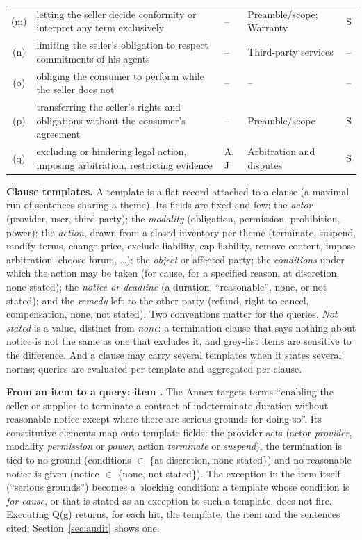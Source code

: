 \begin{table}[t]
\begin{tabular}{@{}c p{5.3cm} p{1.75cm} p{2.7cm} c@{}}
(m) & letting the seller decide conformity or interpret any term exclusively & -- & Preamble/scope; Warranty & S \\
(n) & limiting the seller's obligation to respect commitments of his agents & -- & Third-party services & -- \\
(o) & obliging the consumer to perform while the seller does not & -- & -- & -- \\
(p) & transferring the seller's rights and obligations without the consumer's agreement & -- & Preamble/scope & S \\
(q) & excluding or hindering legal action, imposing arbitration, restricting evidence & A, J & Arbitration and disputes & S \\
\bottomrule
\end{tabular}
\end{table}

\textbf{Clause templates.} A template is a flat record attached to a clause (a maximal run of sentences sharing a theme). Its fields are fixed and few: the \emph{actor} (provider, user, third party); the \emph{modality} (obligation, permission, prohibition, power); the \emph{action}, drawn from a closed inventory per theme (terminate, suspend, modify terms, change price, exclude liability, cap liability, remove content, impose arbitration, choose forum, \ldots); the \emph{object} or affected party; the \emph{conditions} under which the action may be taken (for cause, for a specified reason, at discretion, none stated); the \emph{notice or deadline} (a duration, ``reasonable'', none, or not stated); and the \emph{remedy} left to the other party (refund, right to cancel, compensation, none, not stated). Two conventions matter for the queries. \emph{Not stated} is a value, distinct from \emph{none}: a termination clause that says nothing about notice is not the same as one that excludes it, and grey-list items are sensitive to the difference. And a clause may carry several templates when it states several norms; queries are evaluated per template and aggregated per clause.

\textbf{From an item to a query: item .} The Annex targets terms ``enabling the seller or supplier to terminate a contract of indeterminate duration without reasonable notice except where there are serious grounds for doing so''. Its constitutive elements map onto template fields: the provider acts (actor \emph{provider}, modality \emph{permission} or \emph{power}, action \emph{terminate} or \emph{suspend}), the termination is tied to no ground (conditions $\in$ \{at discretion, none stated\}) and no reasonable notice is given (notice $\in$ \{none, not stated\}). The exception in the item itself (``serious grounds'') becomes a blocking condition: a template whose condition is \emph{for cause}, or that is stated as an exception to such a template, does not fire. Executing Q(g) returns, for each hit, the template, the item and the sentences cited; Section~\ref{sec:audit} shows one.

